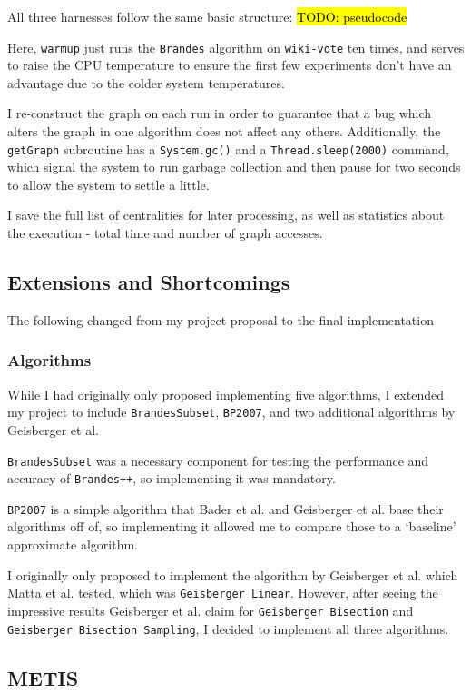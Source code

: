 \documentclass[12pt,a4paper,twoside,openright]{report}
\newcommand{\todo}[1]{\hl{TODO: #1}}
\newcommand{\ttt}[1]{\texttt{#1}}
\begin{document}
		All three harnesses follow the same basic structure:
		\todo{pseudocode}
		
		Here, \ttt{warmup} just runs the \ttt{Brandes} algorithm on \ttt{wiki-vote} ten times, and serves to raise the CPU temperature to ensure the first few experiments don't have an advantage due to the colder system temperatures.
		
		I re-construct the graph on each run in order to guarantee that a bug which alters the graph in one algorithm does not affect any others. Additionally, the \ttt{getGraph} subroutine has a \ttt{System.gc()} and a \ttt{Thread.sleep(2000)} command, which signal the system to run garbage collection and then pause for two seconds to allow the system to settle a little.
		
		I save the full list of centralities for later processing, as well as statistics about the execution - total time and number of graph accesses.
		
		\subsection{Extensions and Shortcomings}\label{sec:extensions}
		The following changed from my project proposal to the final implementation
		\subsubsection{Algorithms}
		
		While I had originally only proposed implementing five algorithms, I extended my project to include \ttt{BrandesSubset}, \ttt{BP2007}, and two additional algorithms by Geisberger et al.
		
		\ttt{BrandesSubset} was a necessary component for testing the performance and accuracy of \ttt{Brandes++}, so implementing it was mandatory.
		
		\ttt{BP2007} is a simple algorithm that Bader et al. and Geisberger et al. base their algorithms off of, so implementing it allowed me to compare those to a `baseline' approximate algorithm.
		
		I originally only proposed to implement the algorithm by Geisberger et al. which Matta et al. tested, which was \ttt{Geisberger Linear}. However, after seeing the impressive results Geisberger et al. claim for \ttt{Geisberger Bisection} and \ttt{Geisberger Bisection Sampling}, I decided to implement all three algorithms.
		
		\subsection{METIS}
		
\end{document}
